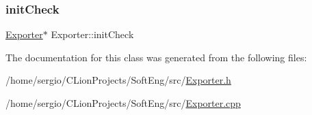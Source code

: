\mbox{\label{class_exporter_a74245e988d8e72a43704dda927acff05}} 
\subsubsection{\texorpdfstring{init\+Check}{initCheck}}
{\footnotesize\ttfamily \hyperlink{class_exporter}{Exporter}$\ast$ Exporter\+::init\+Check\hspace{0.3cm}{\ttfamily [protected]}}



The documentation for this class was generated from the following files\+:\begin{DoxyCompactItemize}
\item 
/home/sergio/\+C\+Lion\+Projects/\+Soft\+Eng/src/\hyperlink{_exporter_8h}{Exporter.\+h}\item 
/home/sergio/\+C\+Lion\+Projects/\+Soft\+Eng/src/\hyperlink{_exporter_8cpp}{Exporter.\+cpp}\end{DoxyCompactItemize}
